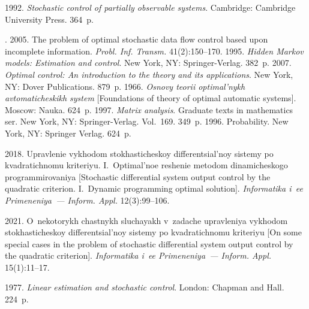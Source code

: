 \begin{multicols}{2}
{{\begin{thebibliography}{99}
       1992. \textit{Stochastic control of partially observable systems}. 
Cambridge: Cambridge University Press. 364~p.

      . 2005. The 
problem of optimal stochastic data flow control based upon incomplete information. \textit{Probl. 
Inf. Transm.} 41(2):150--170.
       1995. \textit{Hidden Markov models: 
Estimation and control}. New York, NY: Springer-Verlag. 382~p.
       2007. \textit{Optimal control: An introduction to the theory 
and its applications}. New York, NY: Dover Publications. 879~p.
       1966. \textit{Osnovy teorii optimal'nykh avtomaticheskikh system} 
[Foundations of theory of optimal automatic systems]. Moscow: Nauka. 624~p.
       1997. \textit{Matrix analysis}. 
      Graduate texts in mathematics ser. New York, NY: Springer-Verlag. Vol.~169. 349~p.
       1996. Probability. New York, NY: Springer Verlag. 624~p.
      
       2018. Upravlenie vykhodom stokhasticheskoy 
differentsial'noy sistemy po kvadratichnomu kriteriyu. I.~Optimal'noe reshenie metodom 
dinamicheskogo programmirovaniya [Stochastic differential system output control by the quadratic 
criterion. I.~Dynamic programming optimal solution]. \textit{Informatika i~ee Primeneniya~--- Inform. 
Appl.} 12(3):99--106.


       2021. O~nekotorykh chastnykh sluchayakh v~zadache upravleniya 
vykhodom stokhasticheskoy differentsial'noy sistemy po kvadratichnomu kriteriyu [On some special 
cases in the problem of stochastic differential system output control by the quadratic criterion]. 
\textit{Informatika i~ee Primeneniya~--- Inform. Appl.} 15(1):11--17.

      
       1977. \textit{Linear estimation and stochastic control}. London: 
Chapman and Hall. 224~p.
      \end{thebibliography}

 }
 }

\end{multicols}

